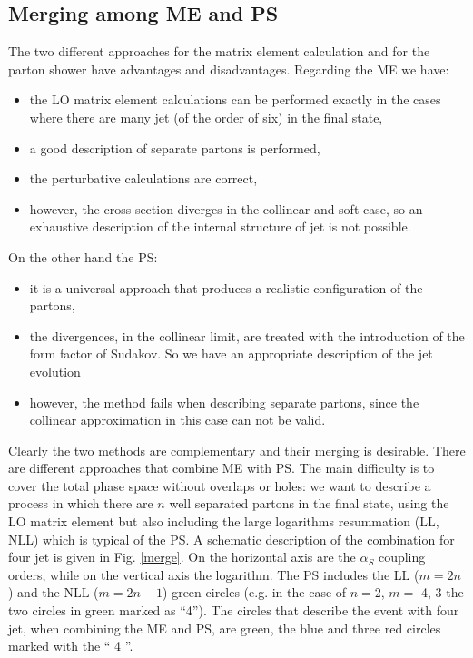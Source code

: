 \subsection*{Merging among ME and PS}
The two different approaches for the  matrix element calculation  and for the parton shower have advantages and disadvantages. Regarding the ME we have:
\begin{itemize}
\item the LO matrix element calculations  can be performed exactly in the cases where there are many jet (of the order of six) in the final state,
\item a good description of separate partons is performed,
\item the perturbative calculations are correct,
\item however, the cross section diverges in the collinear and soft case, so an exhaustive description of the internal structure of jet is not possible.
\end{itemize}
On the other hand the PS:
\begin{itemize}
\item it is a universal approach that produces a realistic configuration of the partons,
\item the divergences, in the collinear limit, are treated with the introduction of the form factor of Sudakov. So we have an appropriate description of the jet evolution
\item however, the method fails when describing separate partons, since the collinear approximation in this case can not be valid.
\end{itemize}
Clearly the two methods are complementary and their merging is desirable. 
There are different approaches that combine ME with PS. The main difficulty is to cover the total phase space without overlaps or holes: we want to describe a process in which there are $ n $ well separated partons in the final state, using the LO matrix element  but  also including the  large logarithms resummation (LL, NLL) which is typical of the PS. A schematic description of the combination for four jet is given in Fig. \ref{merge}.
On the horizontal axis are the $ \alpha_S $ coupling orders, while on the vertical axis  the logarithm.
The PS includes the LL ($ m = 2n $) and the NLL ($ m = 2n-1 $) green circles (e.g. in the case of $ n = 2 $, $ m = $ 4, 3 the two circles  in green  marked as ``4'').
The circles that describe the event with four jet, when combining  the ME and  PS, are  green, the blue  and  three red  circles marked with the `` 4 ''.

